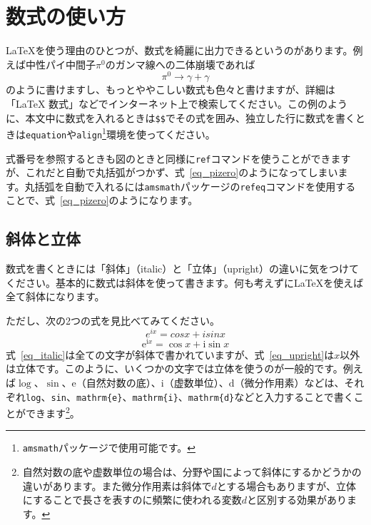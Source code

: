 \section{数式の使い方}

\LaTeX{}を使う理由のひとつが、数式を綺麗に出力できるというのがあります。例えば中性パイ中間子$\pi^0$のガンマ線への二体崩壊であれば
\begin{equation}
  \pi^0 \rightarrow \gamma + \gamma
  \label{eq_pizero}
\end{equation}
のように書けますし、もっとややこしい数式も色々と書けますが、詳細は「LaTeX 数式」などでインターネット上で検索してください。この例のように、本文中に数式を入れるときは\texttt{\$\$}でその式を囲み、独立した行に数式を書くときは\texttt{equation}や\texttt{align}\footnote{\texttt{amsmath}パッケージで使用可能です。}環境を使ってください。

式番号を参照するときも図のときと同様に\texttt{ref}コマンドを使うことができますが、これだと自動で丸括弧がつかず、式~\ref{eq_pizero}のようになってしまいます。丸括弧を自動で入れるには\texttt{amsmath}パッケージの\texttt{refeq}コマンドを使用することで、式~\eqref{eq_pizero}のようになります。

\subsection{斜体と立体}
数式を書くときには「斜体」（italic）と「立体」（upright）の違いに気をつけてください。基本的に数式は斜体を使って書きます。何も考えずに\LaTeX{}を使えば全て斜体になります。

ただし、次の2つの式を見比べてみてください。
\begin{equation}
  e^{ix}=cosx + isinx
  \label{eq_italic}
\end{equation}
\begin{equation}
  \mathrm{e}^{\mathrm{i}x}=\cos x + \mathrm{i}\sin x
  \label{eq_upright}
\end{equation}
式~\eqref{eq_italic}は全ての文字が斜体で書かれていますが、式~\eqref{eq_upright}は$x$以外は立体です。このように、いくつかの文字では立体を使うのが一般的です。例えば$\log$、$\sin$、$\mathrm{e}$（自然対数の底）、$\mathrm{i}$（虚数単位）、$\mathrm{d}$（微分作用素）などは、それぞれ\texttt{\bs{}log}、\texttt{\bs{}sin}、\texttt{\bs{}mathrm\{e\}}、\texttt{\bs{}mathrm\{i\}}、\texttt{\bs{}mathrm\{d\}}などと入力することで書くことができます\footnote{自然対数の底や虚数単位の場合は、分野や国によって斜体にするかどうかの違いがあります。また微分作用素は斜体で$d$とする場合もありますが、立体にすることで長さを表すのに頻繁に使われる変数$d$と区別する効果があります。}。

